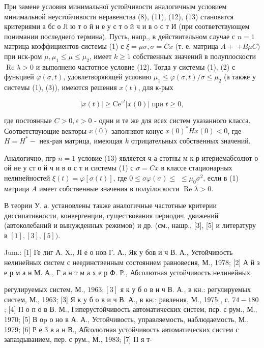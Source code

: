 \documentclass[10pt]{article}
\begin{document}
При замене условия минимальної устойчивости аналогичным условием минимальной неустойчивости неравенства (8), (11), (12), (13) становятся критериями а бс о Јі ю т о й н е у с т о й ч и в о с т И (при соответствующем понимании последнего термина). Пусть, напр., в действительном случае с $n=1$ матрица коэффициентов системы (1) с $\xi=\mu \sigma, \sigma=C x$ (т. е. матрица $A+$ $+B \mu C)$ при нск-ром $\mu, \mu_{1} \leqslant \mu \leqslant \mu_{2}$, имеет $k \geqslant 1$ собственных значений в полуплоскости $\operatorname{Re} \lambda>0$ и выполнено частотное условие (12). Тогда у системы (1), (2) с функцией $\varphi(\sigma, t)$, удовлетворяющей условию $\mu_{1} \leqslant \varphi(\sigma, t) / \sigma \leqslant \mu_{2}$ (а также у системы (1), (3)), имеются решения $x(t)$, для к-рых



\[

|x(t)| \geqslant \mathrm{Ce}^{\varepsilon t}|x(0)| \text { при } t \geqslant 0,

\]



где постоянные $C>0, \varepsilon>0$ - одни и те же для всех систем указанного класса. Соответствующие векторы $x(0)$ заполняют конус $x(0)^{*} H x(0)<0$, где $H=H^{*}-$ нек-рая матрица, имеющая $k$ отрицательных собственных значений.



Аналогично, пгр $n=1$ условие (13) является ч а стотны м к р итериемабсолют о ой не у ст о й ч и в о с т и системы (1) с $\sigma=C x$ в классе стационарных нелинейностей $\xi(t)=\varphi[\sigma(t)]$, где $0 \leqslant \sigma \varphi(\sigma) \leqslant$ $\leqslant \mu_{0} \sigma^{2}$, если в (1) матрица $A$ имеет собственные значения в полуілоскости $\operatorname{Re} \lambda>0$.



В теории У. а. установлены также аналогичные частотные критерии диссипативности, конвергенции, существования периодич. движений (автоколебаний и вынужденных режимов) и др. (см., нашр., [3], [5] и литературу в $[1],[3],[5])$.



Jum.: [1] Ге лиг А. X., ЈІ е о нов Г. А., Як у бов и ч В. А., Устойчивость нелинейных систем с неединственным состоянием равновесия, М., 1978; [2] А й з е р м а н М. А., Г а н т м а х е р Ф. Р., Абсолютная устойчивость нелинейных

регулируемых систем, М., $1963 ;[3]$ я к у б о в и ч В. А., в кн.: регулируемых систем, М., 1963; [3] Я к у б о в и ч В. А., в кн.: равления, М., 1975 , с. $74-180$; [4] П о п о в В. М., Гиперустойчивость автоматических систем, пср. с рум., М., 1970; [5] В оp о но в А. А., Устойчивость, управляемость, наблюдаемость, М., 1979; [6] Р е 3 в а н В., Аб̆солютная устойчивость автоматических систем с запаздыванием, пер. с рум., М., 1983; [7] П я т-
\end{document}
